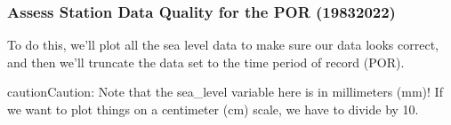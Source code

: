 \documentclass[letterpaper,10pt,english]{jupyterBook}
\begin{document}
\subsubsection{Assess Station Data Quality for the POR (1983\sphinxhyphen{}2022)}
\label{\detokenize{notebooks/FloodFrequency:assess-station-data-quality-for-the-por-1983-2022}}
\sphinxAtStartPar
To do this, we’ll plot all the sea level data to make sure our data looks correct, and then we’ll truncate the data set to the time period of record (POR).

\begin{sphinxShadowBox}

\begin{sphinxadmonition}{caution}{Caution:}
\sphinxAtStartPar
Note that the sea\_level variable here is in millimeters (mm)! If we want to plot things on a centimeter (cm) scale, we have to divide by 10.
\end{sphinxadmonition}
\end{sphinxShadowBox}
\end{document}
